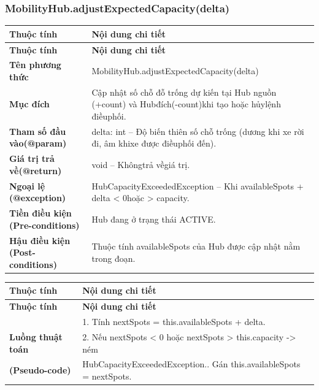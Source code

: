 \subsubsection{MobilityHub.adjustExpectedCapacity(delta)}
\begin{longtable}{|L{0.24\textwidth}|L{0.70\textwidth}|}
\hline
\textbf{Thuộc tính} & \textbf{Nội dung chi tiết} \\
\hline
\endfirsthead
\hline
\textbf{Thuộc tính} & \textbf{Nội dung chi tiết} \\
\hline
\endhead
\textbf{Tên phương thức} & MobilityHub.adjustExpectedCapacity(delta) \\
\hline
\textbf{Mục đích} & Cập nhật số chỗ đỗ trống dự kiến tại Hub nguồn (+count) và Hub\newline đích(-count)khi tạo hoặc hủylệnh điềuphối. \\
\hline
\textbf{Tham số đầu vào}\newline \textbf{(@param)} & delta: int – Độ biến thiên số chỗ trống (dương khi xe rời đi, âm khi\newline xe được điềuphối đến). \\
\hline
\textbf{Giá trị trả về(@return)} & void – Khôngtrả vềgiá trị. \\
\hline
\textbf{Ngoại lệ (@exception)} & HubCapacityExceededException – Khi availableSpots + delta < 0\newline hoặc > capacity. \\
\hline
\textbf{Tiền điều kiện (Pre-}\newline \textbf{conditions)} & Hub đang ở trạng thái ACTIVE. \\
\hline
\textbf{Hậu điều kiện (Post-}\newline \textbf{conditions)} & Thuộc tính availableSpots của Hub được cập nhật nằm trong đoạn\newline [0, capacity]. \\
\hline
\end{longtable}
\vspace{-0.5\baselineskip}
\begin{longtable}{|L{0.24\textwidth}|L{0.70\textwidth}|}
\hline
\textbf{Thuộc tính} & \textbf{Nội dung chi tiết} \\
\hline
\endfirsthead
\hline
\textbf{Thuộc tính} & \textbf{Nội dung chi tiết} \\
\hline
\endhead
 & 1. Tính nextSpots = this.availableSpots + delta. \\
\hline
\textbf{Luồng thuật toán} & 2. Nếu nextSpots < 0 hoặc nextSpots > this.capacity -> ném \\
\hline
\textbf{(Pseudo-code)} & HubCapacityExceededException.. Gán this.availableSpots = nextSpots. \\
\hline
\end{longtable}
\vspace{-0.5\baselineskip}
